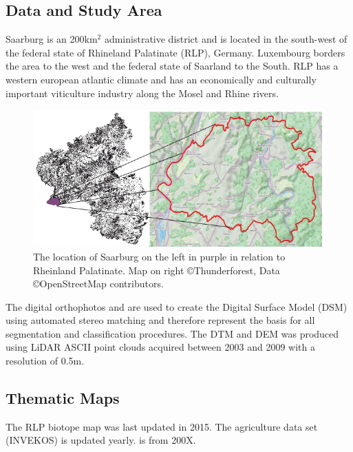 \documentclass[authoryear, review,12pt,number]{elsarticle}
\begin{document}
\subsection{Data and Study Area}
\label{subsec_data_study_area}
Saarburg is an 200km$^{2}$ administrative district and is located in the
south-west of the federal state of Rhineland Palatinate (RLP), Germany.
Luxembourg borders the area to the west and the federal state of Saarland to
the South. RLP has a western european atlantic climate and has an economically
and culturally important viticulture industry along the Mosel and Rhine rivers.
\begin{figure}
\label{fig_study_area}
    \includegraphics[width=\textwidth]{diagrams/study_area_closeup.png}
    \caption{The location of Saarburg on the left in purple in relation to
    Rheinland Palatinate. Map on right \copyright Thunderforest, Data
\copyright OpenStreetMap contributors.}
\end{figure}
The digital orthophotos and are used to create the Digital Surface Model (DSM)
using automated stereo matching and therefore represent the basis for all
segmentation and classification procedures.
The DTM and DEM was produced using LiDAR ASCII point clouds acquired between 
2003 and 2009 with a resolution of 0.5m.\\

\subsection{Thematic Maps}
The RLP biotope map was last updated in 2015. The agriculture data set 
(INVEKOS) is updated yearly. %
is from 200X.
\end{document}
